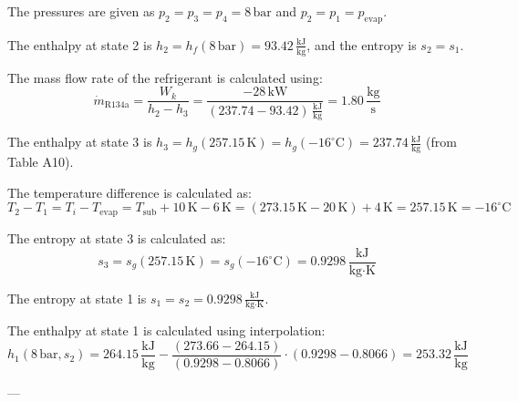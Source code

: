 The pressures are given as \( p_2 = p_3 = p_4 = 8 \, \text{bar} \) and \( p_2 = p_1 = p_{\text{evap}} \).  

The enthalpy at state 2 is \( h_2 = h_f(8 \, \text{bar}) = 93.42 \, \frac{\text{kJ}}{\text{kg}} \), and the entropy is \( s_2 = s_1 \).  

The mass flow rate of the refrigerant is calculated using:  
\[
\dot{m}_{\text{R134a}} = \frac{W_k}{h_2 - h_3} = \frac{-28 \, \text{kW}}{(237.74 - 93.42) \, \frac{\text{kJ}}{\text{kg}}} = 1.80 \, \frac{\text{kg}}{\text{s}}
\]  

The enthalpy at state 3 is \( h_3 = h_g(257.15 \, \text{K}) = h_g(-16^\circ\text{C}) = 237.74 \, \frac{\text{kJ}}{\text{kg}} \) (from Table A10).  

The temperature difference is calculated as:  
\[
T_2 - T_1 = T_i - T_{\text{evap}} = T_{\text{sub}} + 10 \, \text{K} - 6 \, \text{K} = (273.15 \, \text{K} - 20 \, \text{K}) + 4 \, \text{K} = 257.15 \, \text{K} = -16^\circ\text{C}
\]  

The entropy at state 3 is calculated as:  
\[
s_3 = s_g(257.15 \, \text{K}) = s_g(-16^\circ\text{C}) = 0.9298 \, \frac{\text{kJ}}{\text{kg·K}}
\]  

The entropy at state 1 is \( s_1 = s_2 = 0.9298 \, \frac{\text{kJ}}{\text{kg·K}} \).  

The enthalpy at state 1 is calculated using interpolation:  
\[
h_1(8 \, \text{bar}, s_2) = 264.15 \, \frac{\text{kJ}}{\text{kg}} - \frac{(273.66 - 264.15)}{(0.9298 - 0.8066)} \cdot (0.9298 - 0.8066) = 253.32 \, \frac{\text{kJ}}{\text{kg}}
\]  

---